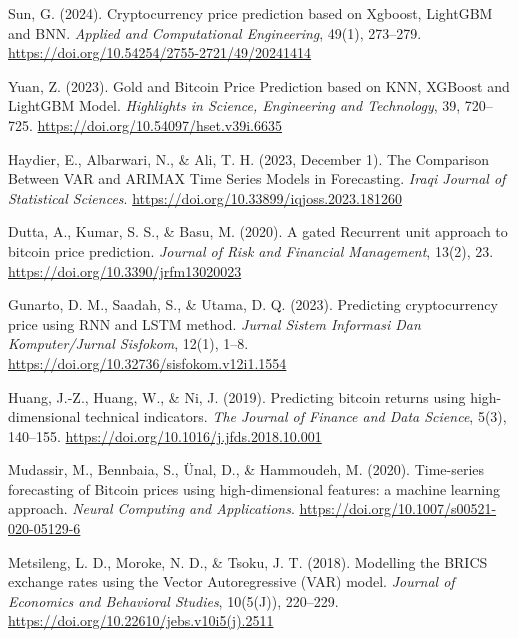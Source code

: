 \documentclass{ieeeojies}
\begin{document}
\begin{thebibliography}{00}
     Sun, G. (2024). Cryptocurrency price prediction based on Xgboost, LightGBM and BNN. \textit{Applied and Computational Engineering}, 49(1), 273–279. \url{https://doi.org/10.54254/2755-2721/49/20241414}

     Yuan, Z. (2023). Gold and Bitcoin Price Prediction based on KNN, XGBoost and LightGBM Model. \textit{Highlights in Science, Engineering and Technology}, 39, 720–725. \url{https://doi.org/10.54097/hset.v39i.6635}

     Haydier, E., Albarwari, N., \& Ali, T. H. (2023, December 1). The Comparison Between VAR and ARIMAX Time Series Models in Forecasting. \textit{Iraqi Journal of Statistical Sciences}. \url{https://doi.org/10.33899/iqjoss.2023.181260}

     Dutta, A., Kumar, S. S., \& Basu, M. (2020). A gated Recurrent unit approach to bitcoin price prediction. \textit{Journal of Risk and Financial Management}, 13(2), 23. \url{https://doi.org/10.3390/jrfm13020023}

     Gunarto, D. M., Saadah, S., \& Utama, D. Q. (2023). Predicting cryptocurrency price using RNN and LSTM method. \textit{Jurnal Sistem Informasi Dan Komputer/Jurnal Sisfokom}, 12(1), 1–8. \url{https://doi.org/10.32736/sisfokom.v12i1.1554}

     Huang, J.-Z., Huang, W., \& Ni, J. (2019). Predicting bitcoin returns using high-dimensional technical indicators. \textit{The Journal of Finance and Data Science}, 5(3), 140–155. \url{https://doi.org/10.1016/j.jfds.2018.10.001}

     Mudassir, M., Bennbaia, S., Ünal, D., \& Hammoudeh, M. (2020). Time-series forecasting of Bitcoin prices using high-dimensional features: a machine learning approach. \textit{Neural Computing and Applications}. \url{https://doi.org/10.1007/s00521-020-05129-6}

     Metsileng, L. D., Moroke, N. D., \& Tsoku, J. T. (2018). Modelling the BRICS exchange rates using the Vector Autoregressive (VAR) model. \textit{Journal of Economics and Behavioral Studies}, 10(5(J)), 220–229. \url{https://doi.org/10.22610/jebs.v10i5(j).2511}
\end{thebibliography}

\EOD
\end{document}
